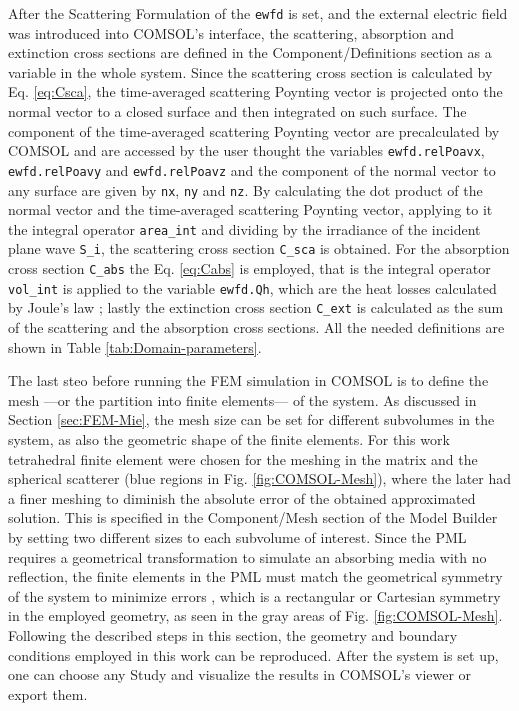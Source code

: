 After the Scattering Formulation of the \lstinline!ewfd! is set, and the external electric field was introduced into COMSOL's interface, the scattering, absorption and extinction cross sections are defined in the Component/Definitions section as a variable in the whole system. Since the scattering cross section is calculated by Eq. \eqref{eq:Csca}, the time-averaged scattering Poynting vector is projected onto the normal vector to a closed surface and then integrated on such surface. The component of the time-averaged scattering Poynting vector are precalculated by COMSOL and are accessed by the user thought the variables  \lstinline!ewfd.relPoavx!, \lstinline!ewfd.relPoavy! and \lstinline!ewfd.relPoavz! \cite{comsol_wave} and the component of the normal vector to any surface are given by \lstinline!nx!, \lstinline!ny! and \lstinline!nz!. By calculating the dot product of the normal vector and the time-averaged scattering Poynting vector, applying to it the integral operator \lstinline!area_int! and dividing by the irradiance of the incident plane wave \lstinline!S_i!, the scattering cross section  \lstinline!C_sca! is obtained. For the absorption cross section \lstinline!C_abs! the Eq. \eqref{eq:Cabs} is employed, that is the integral operator \lstinline!vol_int! is applied to the variable \lstinline!ewfd.Qh!, which are the heat losses calculated by Joule's law \cite{comsol_wave}; lastly the extinction cross section \lstinline!C_ext! is calculated as the sum of the scattering and the absorption cross sections. All the needed definitions are shown in Table \ref{tab:Domain-parameters}.

The last steo before running the FEM simulation in COMSOL is to define the mesh ---or the partition into finite elements--- of the system.  As discussed in Section \ref{sec:FEM-Mie}, the mesh size can be set for different subvolumes in the system, as also the geometric shape of the finite elements. For this work tetrahedral finite element were chosen for the meshing in the matrix and the spherical scatterer (blue regions in Fig. \ref{fig:COMSOL-Mesh}), where the later had a finer meshing to diminish the absolute error of the obtained approximated solution. This is specified in the Component/Mesh section of the Model Builder by setting two different sizes to each subvolume of interest. Since the PML requires a geometrical transformation to simulate an absorbing media with no reflection, the finite elements in the PML must match the  geometrical symmetry of the system to minimize errors \cite{comsol_doc}, which is a rectangular or Cartesian symmetry in the employed geometry, as seen in the gray areas of  Fig. \ref{fig:COMSOL-Mesh}. Following the described steps in this section, the  geometry and boundary conditions employed in this work can be reproduced. After the system is set up, one can choose any Study and visualize the results in COMSOL's viewer or export them.

